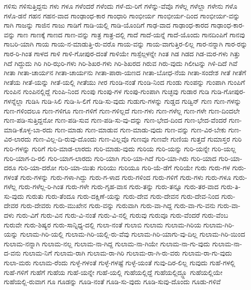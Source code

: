 {ಗಳಿಸು
ಗಳಿಸುತ್ತಿದ್ದನು
ಗಳು
ಗಳೂ
ಗಳೆಂದರೆ
ಗಳೆಂದು
ಗಳೆ-ದು-ರಿಗೆ
ಗಳೆನ್ನು-ವೆವೊ
ಗಳೆಲ್ಲ
ಗಳೆಲ್ಲಾ
ಗಳೇನು
ಗಳೊ
ಗಳೊ-ಡನೆ
ಗಹನ
ಗಹನ-ವಾದ
ಗಾಂಢಾಂಧ-ಕಾರ
ಗಾಂಧಾರಿ
ಗಾಂಭೀರ್ಯ
ಗಾಂಭೀರ್ಯ-ದಿಂದ
ಗಾಂಭೀರ್ಯ-ವನ್ನು
ಗಾಗಿ
ಗಾಜನ್ನು
ಗಾಜಿನ
ಗಾಜು
ಗಾಡಿಗೆ
ಗಾಡಿ-ಯಲ್ಲಿ
ಗಾಡಿ-ಯೊಂದಿಗೆ
ಗಾಢ-ವಾದ
ಗಾಢಾಂಧ-ಕಾರದ
ಗಾಢಾಂಧ-ಕಾರ-ವನ್ನು
ಗಾಣ
ಗಾಣಕ್ಕೆ
ಗಾಣದ
ಗಾಣ-ವನ್ನು
ಗಾತ್ರ
ಗಾತ್ರ-ದಲ್ಲಿ
ಗಾದೆ
ಗಾದೆ-ಯನ್ನೆ
ಗಾದೆ-ಯೊಂದು
ಗಾನದಿಂಪಿಗೆ
ಗಾನವು
ಗಾಬರಿ-ಯಾಗಿ
ಗಾಯ
ಗಾಯ-ನ-ಮಾಡುತ್ತಿ-ರು-ವರೊ
ಗಾಯ-ವನ್ನು
ಗಾಯ-ವಾಗುತ್ತಿರ-ಲಿಲ್ಲ
ಗಾರ-ನನ್ನಾಗಿ
ಗಾರ-ರನ್ನು
ಗಾರ-ರಿ-ಗಿಂತ
ಗಾಳದ
ಗಾಳಿ
ಗಾಳಿ-ಗೋಪುರ-ದಂತೆ
ಗಾಳಿಯೇ
ಗಾಸ್ಪೆಲ್ಗಳನ್ನೇ
ಗಿಂತ
ಗಿಡ
ಗಿಡದ
ಗಿಡ-ಮರ-ಗಳು
ಗಿತ್ತು
ಗಿದೆ
ಗಿದ್ದುದು
ಗಿರಿ
ಗಿರಿ-ಝರಿ-ಗಳು
ಗಿರಿ-ಶಿಖರ-ಗಳು
ಗಿರಿ-ಶಿಖರದ
ಗಿರುವ
ಗಿರು-ವುದು
ಗಿಲೀಟನ್ನು
ಗಿಳಿ-ದಿದೆ
ಗಿವೆ
ಗೀತಾ
ಗೀತಾ-ಚಾರ್ಯನ
ಗೀತಾ-ಚಾರ್ಯನು
ಗೀತಾ-ಪಾರಾ-ಯಣದ
ಗೀತಾ-ಬೋಧ-ನೆಯ
ಗೀತಾ-ಸಂದೇಶ
ಗೀತೆ
ಗೀತೆಗೆ
ಗೀತೆಯ
ಗೀತೆ-ಯನ್ನು
ಗೀತೆ-ಯಲ್ಲಿ
ಗೀತೆಯು
ಗೀರ
ಗುಂಡಿ-ನಂತೆ
ಗುಂಡಿ-ನಿಂದ
ಗುಂಡು
ಗುಂಪನ್ನು
ಗುಂಪಾಗಿ
ಗುಂಪಿಗೆ
ಗುಂಪಿನ
ಗುಂಪಿನಲ್ಲಿದ್ದೆ
ಗುಂಪಿ-ನಿಂದ
ಗುಂಪು
ಗುಂಪು-ಗಳ
ಗುಂಪು-ಗುಂಪಾಗಿ
ಗುಚ್ಛವು
ಗುಡಾರ
ಗುಡಿ
ಗುಡಿ-ಗೋಪುರ-ಗಳನ್ನೆಲ್ಲಾ
ಗುಡಿಸಿ
ಗುಡಿ-ಸಿಲಿ
ಗುಡಿ-ಸಿ-ಲಿಗೆ
ಗುಡಿ-ಸು-ವುದು
ಗುಡುಗು-ಗಳನ್ನು
ಗುಡ್ಡದ
ಗುಡ್ವಿನ್
ಗುಣ
ಗುಣ-ಗಳನ್ನು
ಗುಣ-ಗಳಿಂದಲೂ
ಗುಣ-ಗಳಿಗೂ
ಗುಣ-ಗಳಿಗೆ
ಗುಣ-ಗಳಿಲ್ಲದೆ
ಗುಣ-ಗಳು
ಗುಣ-ಗಳೆಲ್ಲ
ಗುಣ-ಗಳೇ
ಗುಣ-ದಿಂದಲೇ
ಗುಣ-ಪಡಿ-ಸುತ್ತಿದ್ದನೋ
ಗುಣ-ಪಡಿ-ಸುವ
ಗುಣ-ಪಡಿ-ಸು-ವು-ದನ್ನು
ಗುಣ-ಭೇದ-ದಿಂದ
ಗುಣ-ಭೇದ-ವೆಂದರೆ
ಗುಣ-ಮಾಡಿ-ಕೊಳ್ಳ-ಬಾ-ರದು
ಗುಣ-ಮಾಡು
ಗುಣ-ಮಾಡುವ
ಗುಣ-ಮಾಡು-ವುದು
ಗುಣ-ವನ್ನು
ಗುಣ-ವಿರ-ಬೇಕು
ಗುಣ-ವಿರ-ಲಾರದು
ಗುಣ-ವಿಲ್ಲ-ದಿ-ರುವು-ದೊಂದು
ಗುಣ-ವಿಲ್ಲವೊ
ಗುಣವೂ
ಗುಣವೇ
ಗುಣಿಯ
ಗುತ್ತದೆ
ಗುಮಾಸ್ತರ
ಗುರಿ
ಗುರಿ-ಗಳನ್ನು
ಗುರಿಗೆ
ಗುರಿ-ಮಾಡ-ಲಾರದು
ಗುರಿ-ಮಾಡು-ವುದು
ಗುರಿಯ
ಗುರಿ-ಯನ್ನು
ಗುರಿ-ಯನ್ನೇ
ಗುರಿ-ಯಲ್ಲ
ಗುರಿ-ಯಾಗ-ದಿ-ರಲಿ
ಗುರಿ-ಯಾಗ-ಲಾರದು
ಗುರಿ-ಯಾಗಿ
ಗುರಿ-ಯಾ-ಗಿದೆ
ಗುರಿ-ಯಾ-ಗಿರು
ಗುರಿ-ಯಾದ
ಗುರಿ-ಯಾ-ದರೂ
ಗುರಿ-ಯಾ-ದರೋ
ಗುರಿ-ಯಾ-ಯಿತು
ಗುರಿಯು
ಗುರಿಯೂ
ಗುರಿ-ಯೆ-ಡೆಗೆ
ಗುರಿಯೇ
ಗುರು
ಗುರು-ಗಳ
ಗುರು-ಗಳಂತೆ
ಗುರು-ಗಳನ್ನು
ಗುರು-ಗಳಾ-ಗಿದ್ದು
ಗುರು-ಗ-ಳಾದ
ಗುರು-ಗಳಿಂದ
ಗುರು-ಗಳಿಗೆ
ಗುರು-ಗಳು
ಗುರು-ಗಳೂ
ಗುರು-ಗಳೆಲ್ಲ
ಗುರು-ಗಳೆಲ್ಲ-ರಿ-ಗಿಂತ
ಗುರು-ಗಳೇ
ಗುರು-ಗೃಹ-ವಾಸ
ಗುರು-ತನ್ನು
ಗುರು-ತನ್ನೂ
ಗುರು-ತರ-ವಾದ
ಗುರು-ತಿ-ಸು-ವುದು
ಗುರುತು
ಗುರು-ತೆಂದೂ
ಗುರು-ದಕ್ಷಿಣೆ-ಯನ್ನು
ಗುರು-ದೇವ
ಗುರು-ದೇವನ
ಗುರು-ದೇವ-ನಿಂದ
ಗುರು-ದೇವರ
ಗುರು-ದೇವರು
ಗುರು-ಮುಖೇನ
ಗುರು-ವನ್ನು
ಗುರುವಾಗಿ
ಗುರು-ವಾ-ಗಿದ್ದ
ಗುರು-ವಾ-ಗು-ವನು
ಗುರು-ವಾ-ದಳು
ಗುರು-ವಿಗೆ
ಗುರು-ವಿನ
ಗುರು-ವಿ-ನಂತೆ
ಗುರು-ವಿ-ನಲ್ಲಿ
ಗುರುವು
ಗುರುವೂ
ಗುರು-ವೆಂದರೆ
ಗುರು-ವೆಂಬ
ಗುರುವೇ
ಗುರು-ಶಿಷ್ಯರ
ಗುರು-ಸಾನ್ನಿಧ್ಯ-ದಲ್ಲಿ
ಗುಲಾ-ನಂತೆ
ಗುಲಾಬಿ
ಗುಲಾಮ
ಗುಲಾಮ-ಗಿರಿಯ
ಗುಲಾಮ-ಗಿರಿ-ಯನ್ನು
ಗುಲಾಮ-ಗಿರಿ-ಯಲ್ಲಿ
ಗುಲಾಮ-ಗಿರಿ-ಯಲ್ಲಿ-ರು-ವೆವು
ಗುಲಾಮ-ಗಿರಿ-ಯಾಗು-ವು-ದಿಲ್ಲ
ಗುಲಾಮ-ಗಿರಿ-ಯಿಂದ
ಗುಲಾಮ-ನನ್ನಾಗಿ
ಗುಲಾಮ-ನಲ್ಲ
ಗುಲಾಮ-ನಾ-ಗಿದ್ದ
ಗುಲಾಮ-ನಾ-ಗಿಯೇ
ಗುಲಾಮ-ನಾ-ಗು-ವುದು
ಗುಲಾಮ-ನಾ-ದ-ವನು
ಗುಲಾಮ-ನಿಗೆ
ಗುಲಾಮ-ರಾಗಿ
ಗುಲಾಮ-ರಾ-ಗಿರಿ
ಗುಲಾಮ-ರಾ-ಗಿ-ರು-ವರು
ಗುಲಾಮ-ರಾ-ಗು-ವುದು
ಗುಲಾ-ಮರು
ಗುಲಾಮ-ರೆಂದು
ಗುಳ್ಳೆ-ಗಳಂತೆ
ಗುಳ್ಳೆ-ಗಳಷ್ಟೆ
ಗುಳ್ಳೆ-ಯಂತೆ
ಗುವು-ದಿರ-ಲಿಲ್ಲ
ಗುವುದು
ಗುಹೆ-ಗಳಲ್ಲಿ
ಗುಹೆ-ಗಳಿಗೆ
ಗುಹೆಗೆ
ಗುಹೆಯ
ಗುಹೆ-ಯನ್ನೇ
ಗುಹೆ-ಯಲ್ಲಿ
ಗುಹೆಯಲ್ಲಿದ್ದೆ
ಗುಹೆಯಲ್ಲಿದ್ದ್ದೂ
ಗುಹೆಯಲ್ಲಿಯೇ
ಗುಹೆಯಲ್ಲಿ-ರುವಾಗ
ಗೂ
ಗೂಡನ್ನು
ಗೂಡಿ-ನಂತೆ
ಗೂಡಿ-ಸು-ವುದು
ಗೂಡಿ-ಸುವು-ದೊಂದು
ಗೂಡು-ಗಳಿವೆ
}
